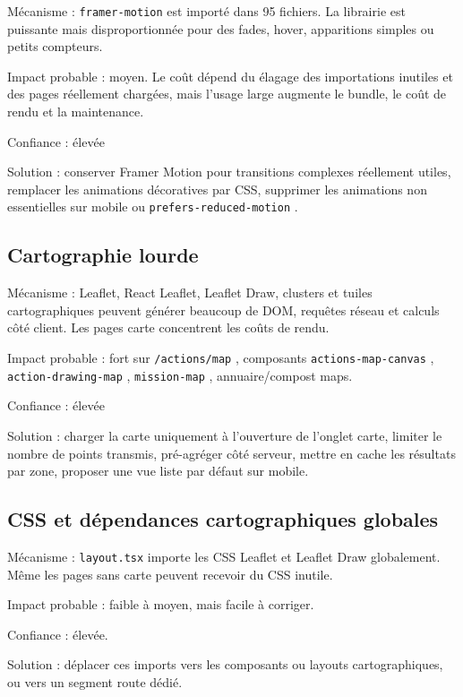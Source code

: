 \documentclass[
  10pt,
  a4paper,
  DIV=11,
  numbers=noendperiod,
  oneside]{scrreprt}
\begin{document}
Mécanisme : \texttt{framer-motion} est importé dans 95 fichiers. La
librairie est puissante mais disproportionnée pour des fades, hover,
apparitions simples ou petits compteurs.

Impact probable : moyen. Le coût dépend du élagage des importations
inutiles et des pages réellement chargées, mais l'usage large augmente
le bundle, le coût de rendu et la maintenance.

Confiance : élevée

Solution : conserver Framer Motion pour transitions complexes réellement
utiles, remplacer les animations décoratives par CSS, supprimer les
animations non essentielles sur mobile ou
\texttt{prefers-reduced-motion} .

\subsection{Cartographie lourde}\label{cartographie-lourde}

Mécanisme : Leaflet, React Leaflet, Leaflet Draw, clusters et tuiles
cartographiques peuvent générer beaucoup de DOM, requêtes réseau et
calculs côté client. Les pages carte concentrent les coûts de rendu.

Impact probable : fort sur \texttt{/actions/map} , composants
\texttt{actions-map-canvas} , \texttt{action-drawing-map} ,
\texttt{mission-map} , annuaire/compost maps.

Confiance : élevée

Solution : charger la carte uniquement à l'ouverture de l'onglet carte,
limiter le nombre de points transmis, pré-agréger côté serveur, mettre
en cache les résultats par zone, proposer une vue liste par défaut sur
mobile.

\subsection{CSS et dépendances cartographiques
globales}\label{css-et-duxe9pendances-cartographiques-globales}

Mécanisme : \texttt{layout.tsx} importe les CSS Leaflet et Leaflet Draw
globalement. Même les pages sans carte peuvent recevoir du CSS inutile.

Impact probable : faible à moyen, mais facile à corriger.

Confiance : élevée.

Solution : déplacer ces imports vers les composants ou layouts
cartographiques, ou vers un segment route dédié.
\end{document}
